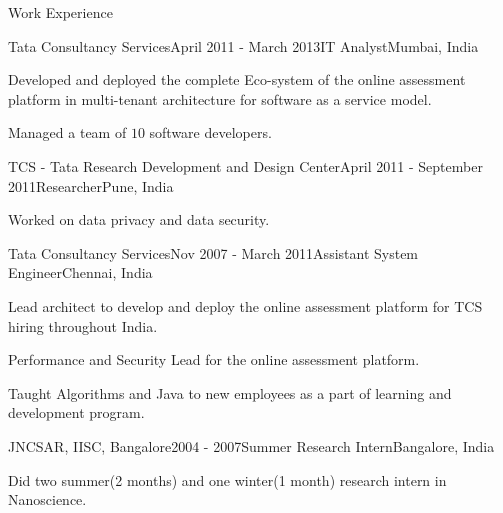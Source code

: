 \documentclass{resume} %
\begin{document}
\begin{rSection}{Work Experience}
\begin{rSubsection}{Tata Consultancy Services}{April 2011 - March 2013}{IT Analyst}{Mumbai, India}
\item Developed and deployed the complete Eco-system of the online assessment platform in multi-tenant architecture for software as a service model.
\item Managed a team of $10$ software developers.  
\end{rSubsection}
\begin{rSubsection}{TCS - Tata Research Development and Design Center}{April 2011 - September 2011}{Researcher}{Pune, India}
\item Worked on data privacy and data security.
\end{rSubsection}
\begin{rSubsection}{Tata Consultancy Services}{Nov 2007 - March 2011}{Assistant System Engineer}{Chennai, India}
\item Lead architect to develop and deploy the online assessment platform for TCS hiring throughout India.
\item Performance and Security Lead for the online assessment platform.
\item Taught Algorithms and Java to new employees as a part of learning and development program.%
\end{rSubsection}
\begin{rSubsection}{JNCSAR, IISC, Bangalore}{2004 - 2007}{Summer Research Intern}{Bangalore, India}
\item Did two summer(2 months) and one winter(1 month) research intern in Nanoscience.
\end{rSubsection}

\end{rSection}

\end{document}
